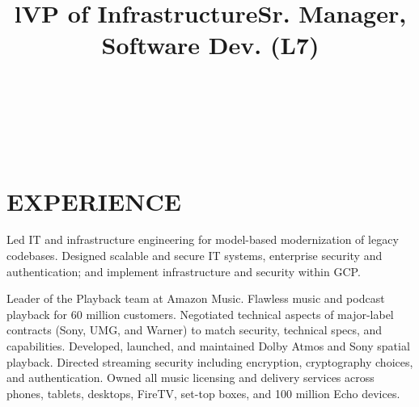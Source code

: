 \documentclass[margin]{res}
\begin{document}
\bigskip

\address{2528 Chilton Way\\ken@hero.net}
\address{Berkeley, CA 94704\\(310) 383-7981}

\begin{resume}

\begin{format}
\title{l}\\
\\
\body\\
\end{format}

\section{EXPERIENCE}

\title{\textbf{VP of Infrastructure}}
\begin{position}
  \hspace*{.5cm}Led IT and infrastructure engineering for model-based modernization of legacy codebases. Designed scalable and secure IT systems, enterprise security and authentication; and implement infrastructure and security within GCP.
\end{position}

\title{\textbf{Sr. Manager, Software Dev. (L7)}}
\begin{position}
\hspace*{.25cm}Leader of the Playback team at Amazon Music. Flawless music and podcast playback for 60 million customers. Negotiated technical aspects of major-label contracts (Sony, UMG, and Warner) to match security, technical specs, and capabilities. Developed, launched, and maintained Dolby Atmos and Sony spatial playback. Directed streaming security including encryption, cryptography choices, and authentication. Owned all music licensing and delivery services across phones, tablets, desktops, FireTV, set-top boxes, and 100 million Echo devices. 
\end{position}


\end{resume}
\end{document}
